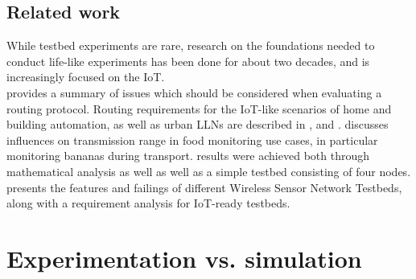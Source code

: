 \documentclass{acm_proc_article-sp}
\begin{document}
\subsection{Related work}
\label{subsec:related_work}
While testbed experiments are rare, research on the foundations needed to conduct life-like experiments has been done for about two decades, and is increasingly focused on the IoT.\\
\cite{RFC-2501} provides a summary of issues which should be considered when evaluating a routing protocol. Routing requirements for the IoT-like scenarios of home and building automation, as well as urban \glspl{LLN} are described in \cite{RFC-5826}, \cite{RFC-5867} and \cite{RFC-5548}.
\cite{food_monitoring} discusses influences on transmission range in food monitoring use cases, in particular monitoring bananas during transport. results were achieved both through mathematical analysis as well as well as a simple testbed consisting of four nodes.
\cite{testbed-survey} presents the features and failings of different Wireless Sensor Network Testbeds, along with a requirement analysis for IoT-ready testbeds.

\section{Experimentation vs. simulation}
\label{sec:simulation_cons}
\end{document}
